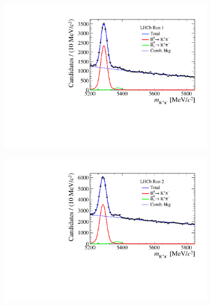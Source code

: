 {{\begin{figure}[htbp]
    \label{fig:Bujpsikyield}
\end{figure}
\begin{figure}[htbp]
    \centering
  \begin{subfigure}[b]{0.48\textwidth}
        \includegraphics[width=  \textwidth]{./Figs/BFAnalysis/Bd2KPi_mass_RunI_BDTbinNone.pdf}
    \end{subfigure}
    \begin{subfigure}[b]{0.48\textwidth}
       \includegraphics[width=\textwidth]{./Figs/BFAnalysis/Bd2KPi_mass_RunII_BDTbinNone.pdf}

\end{subfigure}
\end{figure}}}
